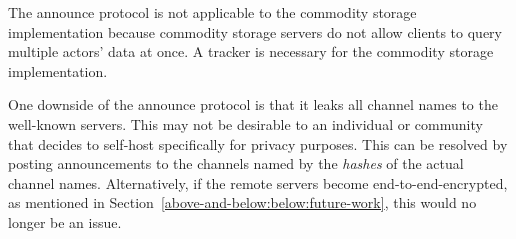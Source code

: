 The announce protocol is not applicable to the commodity storage implementation
because commodity storage servers do not allow clients to
query multiple actors' data at once. A tracker is necessary
for the commodity storage implementation.

One downside of the announce protocol is that it leaks all
channel names to the well-known servers.
This may not be desirable to an individual or community that
decides to self-host specifically for privacy purposes.
This can be resolved by posting announcements to the channels
named by the \emph{hashes} of the actual channel names.
Alternatively, if the remote servers become end-to-end-encrypted,
as mentioned in Section~\ref{above-and-below:below:future-work},
this would no longer be an issue.








